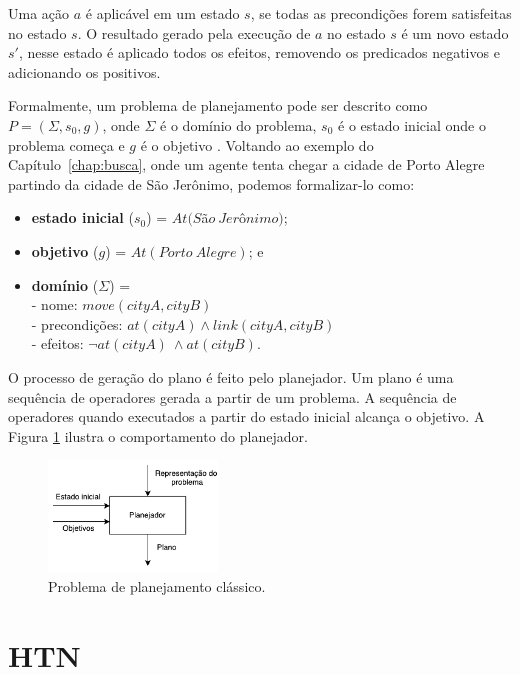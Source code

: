 Uma ação $a$ é aplicável em um estado $s$, se todas as precondições forem satisfeitas no estado $s$. O resultado gerado pela execução de $a$ no estado $s$ é um novo estado $s'$, nesse estado é aplicado todos os efeitos, removendo os predicados negativos e adicionando os positivos.

Formalmente, um problema de planejamento pode ser descrito como $P = (\Sigma, s_{0}, g)$, onde $\Sigma$ é o domínio do problema, $s_{0}$ é o estado inicial onde o problema começa e $g$ é o objetivo \cite{ghallab2004automated}. Voltando ao exemplo do Capítulo~\ref{chap:busca}, onde um agente tenta chegar a cidade de Porto Alegre partindo da cidade de São Jerônimo, podemos formalizar-lo como:

\begin{itemize}
	\item \textbf{estado inicial} ($s_{0}$) = $At(S$\~a$o~Jer$\^o$nimo)$;
	\item \textbf{objetivo} ($g$) = $At(Porto~Alegre)$; e
	\item \textbf{domínio} ($\Sigma$) = \\
	-	nome: $move(cityA, cityB)$\\
	-	precondições: $at(cityA) \wedge link(cityA, cityB)$\\
	-	efeitos: $\neg at(cityA)~ \wedge at(cityB)$.
\end{itemize}

O processo de geração do plano é feito pelo planejador. Um plano é uma sequência de operadores gerada a partir de um problema. A sequência de operadores quando executados a partir do estado inicial alcança o objetivo. A Figura \ref{fig:planmodelo} ilustra o comportamento do planejador.

\begin{figure}[ht]
	\centering
	\includegraphics[width=0.4\textwidth]{fig/modelo.pdf}
	\caption{Problema de planejamento clássico.}
	\label{fig:planmodelo}
\end{figure} 

\section{HTN} 


